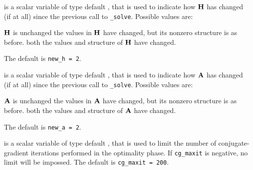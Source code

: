 \begin{description}





 is a scalar variable of type default \integer, that is used
to indicate how ${\mathbf{H}}$ has changed (if at all) since the previous call
to {\tt \packagename\_solve}. Possible values are:
\begin{description}
 ${\mathbf{H}}$ is unchanged
 the values in ${\mathbf{H}}$ have changed, but its nonzero structure
is as before.
 both the values and structure of ${\mathbf{H}}$ have changed.
\end{description}
The default is {\tt new\_h = 2}.

 is a scalar variable of type default \integer, that is used
to indicate how ${\mathbf{A}}$ has changed (if at all) since the previous call
to {\tt \packagename\_solve}. Possible values are:
\begin{description}
 ${\mathbf{A}}$ is unchanged
 the values in ${\mathbf{A}}$ have changed, but its nonzero structure
is as before.
 both the values and structure of ${\mathbf{A}}$ have changed.
\end{description}
The default is {\tt new\_a = 2}.

 is a scalar variable of type default \integer, that is used
to limit the number of conjugate-gradient iterations performed in
the optimality phase. If
{\tt cg\_maxit} is negative, no limit will be impossed. The default
is {\tt cg\_maxit = 200}.


\end{description}
